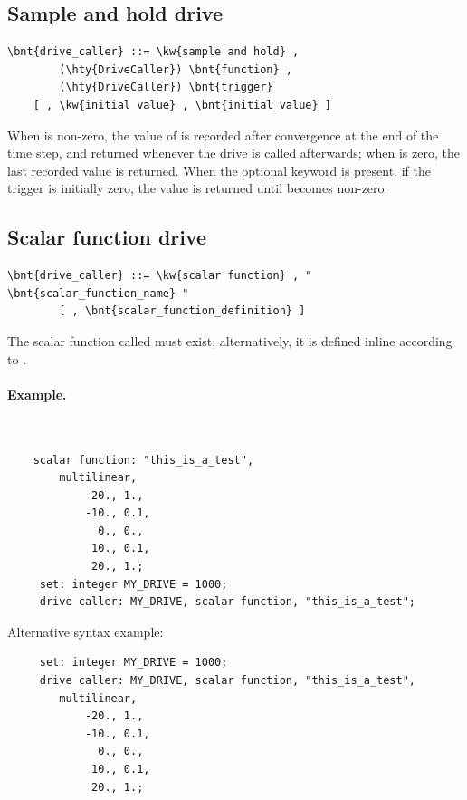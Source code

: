 \subsection{Sample and hold drive}
\begin{Verbatim}[commandchars=\\\{\}]
    \bnt{drive_caller} ::= \kw{sample and hold} ,
        (\hty{DriveCaller}) \bnt{function} ,
        (\hty{DriveCaller}) \bnt{trigger}
	[ , \kw{initial value} , \bnt{initial_value} ]
\end{Verbatim}
When  is non-zero, the value of 
is recorded after convergence at the end of the time step,
and returned whenever the drive is called afterwards;
when  is zero, the last recorded value is returned.
When the optional keyword  is present,
if the trigger is initially zero, the value 
is returned until  becomes non-zero.

\subsection{Scalar function drive}
\begin{Verbatim}[commandchars=\\\{\}]
    \bnt{drive_caller} ::= \kw{scalar function} , " \bnt{scalar_function_name} "
        [ , \bnt{scalar_function_definition} ]
\end{Verbatim}
The scalar function called  must exist;
alternatively, it is defined inline according to
.

\paragraph{Example.} \
\begin{verbatim}
    scalar function: "this_is_a_test",
        multilinear,
            -20., 1.,
            -10., 0.1,
              0., 0.,
             10., 0.1,
             20., 1.;
     set: integer MY_DRIVE = 1000;
     drive caller: MY_DRIVE, scalar function, "this_is_a_test";
\end{verbatim}
Alternative syntax example:
\begin{verbatim}
     set: integer MY_DRIVE = 1000;
     drive caller: MY_DRIVE, scalar function, "this_is_a_test",
        multilinear,
            -20., 1.,
            -10., 0.1,
              0., 0.,
             10., 0.1,
             20., 1.;
\end{verbatim}

